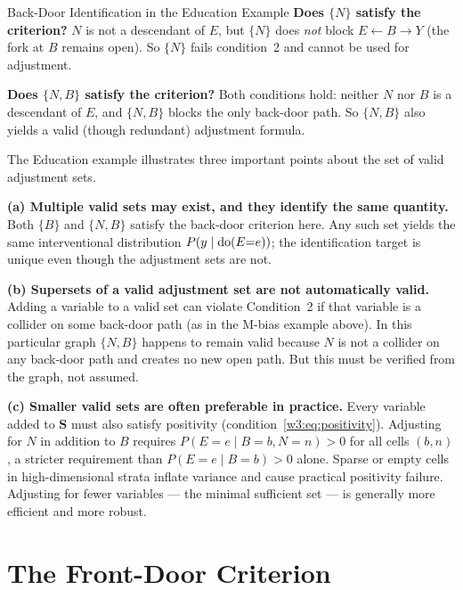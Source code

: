 \documentclass[master.tex]{subfiles}
\begin{document}
\begin{example}{Back-Door Identification in the Education Example}
\medskip\noindent
\textbf{Does $\{N\}$ satisfy the criterion?}
$N$ is not a descendant of $E$, but $\{N\}$ does \emph{not} block
$E \leftarrow B \to Y$ (the fork at $B$ remains open).  So $\{N\}$ fails
condition~2 and cannot be used for adjustment.

\medskip\noindent
\textbf{Does $\{N, B\}$ satisfy the criterion?}
Both conditions hold: neither $N$ nor $B$ is a descendant of $E$, and
$\{N,B\}$ blocks the only back-door path.  So $\{N,B\}$ also yields a
valid (though redundant) adjustment formula.
\end{example}

\begin{remark}
The Education example illustrates three important points about the set of
valid adjustment sets.

\textbf{(a) Multiple valid sets may exist, and they identify the same
quantity.}  Both $\{B\}$ and $\{N,B\}$ satisfy the back-door criterion
here.  Any such set yields the same interventional distribution
$P(y \mid \mathrm{do}(E{=}e))$; the identification target is unique even though
the adjustment sets are not.

\textbf{(b) Supersets of a valid adjustment set are not automatically
valid.}  Adding a variable to a valid set can violate Condition~2 if that
variable is a collider on some back-door path (as in the M-bias example
above).  In this particular graph $\{N,B\}$ happens to remain valid
because $N$ is not a collider on any back-door path and creates no new
open path.  But this must be verified from the graph, not assumed.

\textbf{(c) Smaller valid sets are often preferable in practice.}  Every
variable added to $\mathbf{S}$ must also satisfy positivity
(condition~\eqref{w3:eq:positivity}).  Adjusting for $N$ in addition to
$B$ requires $P(E{=}e \mid B{=}b, N{=}n) > 0$ for all cells $(b,n)$, a
stricter requirement than $P(E{=}e \mid B{=}b) > 0$ alone.  Sparse or
empty cells in high-dimensional strata inflate variance and cause practical
positivity failure.  Adjusting for fewer variables --- the minimal
sufficient set --- is generally more efficient and more robust.
\end{remark}

\section{The Front-Door Criterion}
\label{w3:sec:frontdoor}
\end{document}
